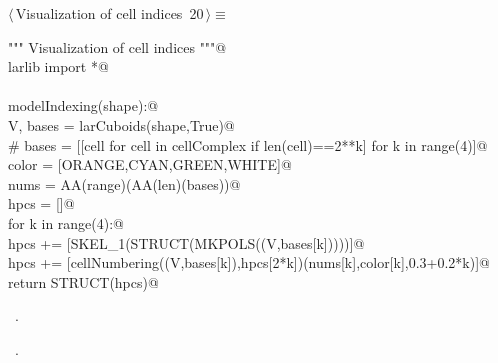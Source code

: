 \documentclass[11pt,oneside]{article}    %
\begin{document}
\begin{flushleft} \small \label{scrap32}
\protect{}$\langle\,$Visualization of cell indices\nobreak\ {\footnotesize 20}$\,\rangle\equiv$
\vspace{-1ex}
\begin{list}{}{} \item
\mbox{}\verb@""" Visualization of cell indices """@\\
\mbox{}\verb@from larlib import *@\\
\mbox{}\verb@@\\
\mbox{}\verb@def modelIndexing(shape):@\\
\mbox{}\verb@    V, bases = larCuboids(shape,True)@\\
\mbox{}\verb@    # bases = [[cell for cell in cellComplex if len(cell)==2**k] for k in range(4)]@\\
\mbox{}\verb@    color = [ORANGE,CYAN,GREEN,WHITE]@\\
\mbox{}\verb@    nums = AA(range)(AA(len)(bases))@\\
\mbox{}\verb@    hpcs = []@\\
\mbox{}\verb@    for k in range(4):@\\
\mbox{}\verb@        hpcs += [SKEL_1(STRUCT(MKPOLS((V,bases[k]))))]@\\
\mbox{}\verb@        hpcs += [cellNumbering((V,bases[k]),hpcs[2*k])(nums[k],color[k],0.3+0.2*k)]@\\
\mbox{}\verb@    return STRUCT(hpcs)@\\
\mbox{}\verb@@{\NWsep}
\end{list}
\vspace{-1ex}
\footnotesize\addtolength{\baselineskip}{-1ex}
\begin{list}{}{\setlength{\itemsep}{-\parsep}\setlength{\itemindent}{-\leftmargin}}
\item \NWtxtMacroDefBy\ .
\item \NWtxtMacroRefIn\ .
\end{list}
\end{flushleft}
\end{document}
